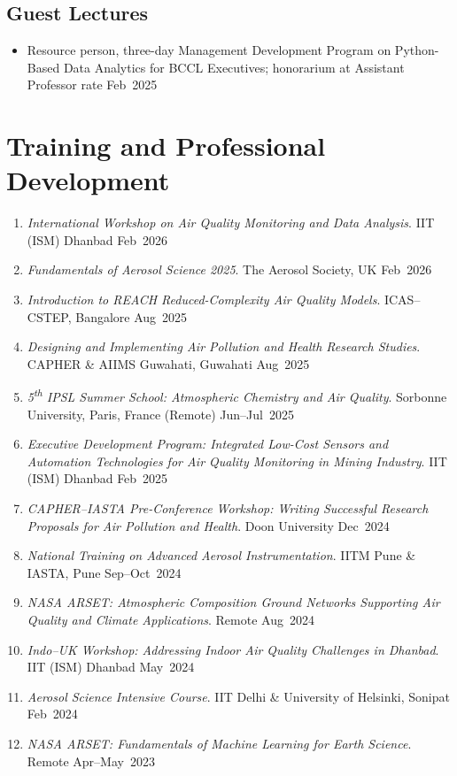 \documentclass[11pt, a4paper]{article}
\begin{document}
\subsection*{Guest Lectures}
\begin{itemize}[leftmargin=*,noitemsep]
  \item Resource person, three-day Management Development Program on Python-Based Data
  Analytics for BCCL Executives; honorarium at Assistant Professor rate \hfill\mbox{Feb 2025}
\end{itemize}

\section*{Training and Professional Development}
\begin{enumerate}[leftmargin=*,label=\textbf{W\arabic*.}]
  \item \textit{International Workshop on Air Quality Monitoring and Data Analysis}.
  IIT (ISM) Dhanbad \hfill\mbox{Feb 2026}
  \item \textit{Fundamentals of Aerosol Science 2025}. The Aerosol Society, UK
  \hfill\mbox{Feb 2026}
  \item \textit{Introduction to REACH Reduced-Complexity Air Quality Models}.
  ICAS--CSTEP, Bangalore \hfill\mbox{Aug 2025}
  \item \textit{Designing and Implementing Air Pollution and Health Research Studies}.
  CAPHER \& AIIMS Guwahati, Guwahati \hfill\mbox{Aug 2025}
  \item \textit{5\textsuperscript{th} IPSL Summer School: Atmospheric Chemistry and
  Air Quality}. Sorbonne University, Paris, France (Remote) \hfill\mbox{Jun--Jul 2025}
  \item \textit{Executive Development Program: Integrated Low-Cost Sensors and
  Automation Technologies for Air Quality Monitoring in Mining Industry}.
  IIT (ISM) Dhanbad \hfill\mbox{Feb 2025}
  \item \textit{CAPHER--IASTA Pre-Conference Workshop: Writing Successful Research
  Proposals for Air Pollution and Health}. Doon University \hfill\mbox{Dec 2024}
  \item \textit{National Training on Advanced Aerosol Instrumentation}.
  IITM Pune \& IASTA, Pune \hfill\mbox{Sep--Oct 2024}
  \item \textit{NASA ARSET: Atmospheric Composition Ground Networks Supporting Air
  Quality and Climate Applications}. Remote \hfill\mbox{Aug 2024}
  \item \textit{Indo--UK Workshop: Addressing Indoor Air Quality Challenges in
  Dhanbad}. IIT (ISM) Dhanbad \hfill\mbox{May 2024}
  \item \textit{Aerosol Science Intensive Course}. IIT Delhi \& University of
  Helsinki, Sonipat \hfill\mbox{Feb 2024}
  \item \textit{NASA ARSET: Fundamentals of Machine Learning for Earth Science}.
  Remote \hfill\mbox{Apr--May 2023}
\end{enumerate}
\end{document}
